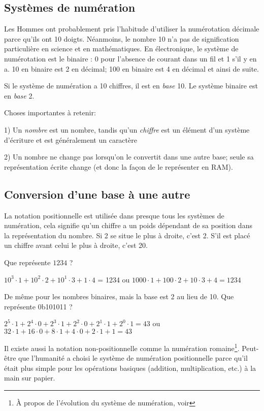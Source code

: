 ﻿\subsection{Systèmes de numération}

Les Hommes ont probablement pris l'habitude d'utiliser la numérotation décimale parce
qu'ils ont 10 doigts. Néanmoins, le nombre 10 n'a pas de signification particulière
en science et en mathématiques. En électronique, le système de numérotation est le
binaire : 0 pour l'absence de courant dans un fil et 1 s'il y en a. 10 en binaire
est 2 en décimal; 100 en binaire est 4 en décimal et ainsi de suite.

Si le système de numération a 10 chiffres, il est en \emph{base} 10. %
Le système binaire est en \emph{base} 2.

Choses importantes à retenir:

1) Un \emph{nombre} est un nombre, tandis qu'un \emph{chiffre} est
un élément d'un système d'écriture et est généralement un caractère

2) Un nombre ne change pas lorsqu'on le convertit dans une autre base; seule sa
représentation écrite change (et donc la façon de le représenter en \ac{RAM}).

\subsection{Conversion d'une base à une autre}

La notation positionnelle est utilisée dans presque tous les systèmes de numération,
cela signifie qu'un chiffre a un poids dépendant de sa position dans la représentation
du nombre. Si 2 se situe le plus à droite, c'est 2. S'il est placé un chiffre avant
celui le plus à droite, c'est 20.

Que représente $1234$ ?

$10^3 \cdot 1 + 10^2 \cdot 2 + 10^1 \cdot 3 + 1 \cdot 4$ = 1234 ou $1000 \cdot 1 +
100 \cdot 2 + 10 \cdot 3 + 4 = 1234$

De même pour les nombres binaires, mais la base est 2 au lieu de 10. Que représente
0b101011 ?

$2^5 \cdot 1 + 2^4 \cdot 0 + 2^3 \cdot 1 + 2^2 \cdot 0 + 2^1 \cdot 1 + 2^0 \cdot 1 =
43$ ou $32 \cdot 1 + 16 \cdot 0 + 8 \cdot 1 + 4 \cdot 0 + 2 \cdot 1 + 1 = 43$

Il existe aussi la notation non-positionnelle comme la numération romaine\footnote{À
propos de l'évolution du système de numération, voir }.
Peut-être que l'humanité a choisi le système de numération positionnelle parce qu'il
était plus simple pour les opérations basiques (addition, multiplication, etc.) à
la main sur papier.


